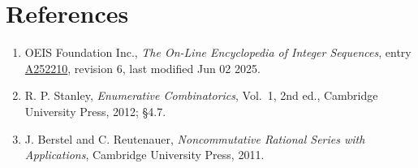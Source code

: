 \documentclass[11pt]{article}
\theoremstyle{definition}
\begin{document}
\section{References}

\begin{enumerate}

\item OEIS Foundation Inc., \emph{The On-Line Encyclopedia of Integer Sequences}, entry \href{https://oeis.org/A252210}{A252210}, revision 6, last modified Jun 02 2025.

\item R. P. Stanley, \emph{Enumerative Combinatorics}, Vol.~1, 2nd ed., Cambridge University Press, 2012; \S4.7.

\item J. Berstel and C. Reutenauer, \emph{Noncommutative Rational Series with Applications}, Cambridge University Press, 2011.

\end{enumerate}
\end{document}
